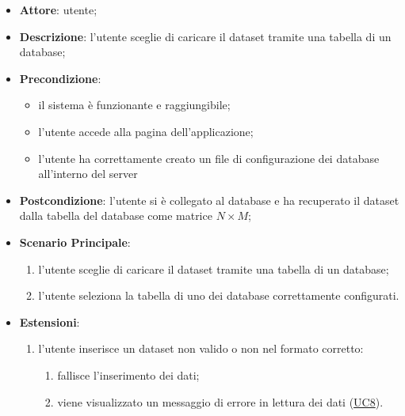     \begin{itemize}
    \item \textbf{Attore}: utente;
    \item \textbf{Descrizione}: l'utente sceglie di caricare il dataset tramite una tabella di un database;
    \item \textbf{Precondizione}:
    \begin{itemize}
        \item il sistema è funzionante e raggiungibile;
        \item l'utente accede alla pagina dell'applicazione;
        \item l'utente ha correttamente creato un file di configurazione dei database all'interno del server
    \end{itemize}
    \item \textbf{Postcondizione}: l'utente si è collegato al database e ha recuperato il dataset dalla tabella del database come matrice $N\times M$;
    \item \textbf{Scenario Principale}: 
        \begin{enumerate}
            \item l'utente sceglie di caricare il dataset tramite una tabella di un database;
            \item l'utente seleziona la tabella di uno dei database correttamente configurati.
        \end{enumerate}
        \item \textbf{Estensioni}:
        \begin{enumerate}
            \item l'utente inserisce un dataset non valido o non nel formato corretto:
                \begin{enumerate}
                    \item fallisce l'inserimento dei dati;
                    \item viene visualizzato un messaggio di errore in lettura dei dati (\hyperref[uc8]{UC8}).
                \end{enumerate}
        \end{enumerate}  
    \end{itemize}

    